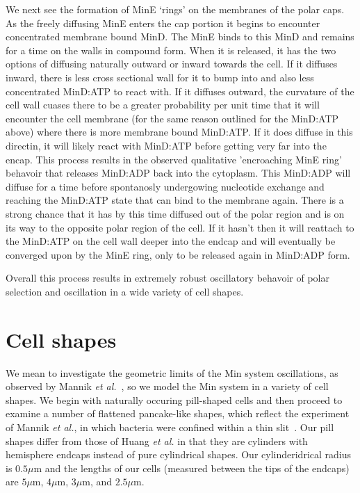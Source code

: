 \documentclass[letterpaper,twocolumn,amsmath,amssymb,pre]{revtex4-1}
\newcommand\micron{\ensuremath{\mu\text{m}}}
\begin{document}
We next see the formation of MinE `rings' on the membranes of the
polar caps.  As the freely diffusing MinE enters the cap portion it
begins to encounter concentrated membrane bound MinD.  The MinE binds
to this MinD and remains for a time on the walls in compound form.
When it is released, it has the two options of diffusing naturally
outward or inward towards the cell.  If it diffuses inward, there is
less cross sectional wall for it to bump into and also less
concentrated MinD:ATP to react with.  If it diffuses outward, the
curvature of the cell wall cuases there to be a greater probability
per unit time that it will encounter the cell membrane (for the same
reason outlined for the MinD:ATP above) where there is more membrane
bound MinD:ATP. If it does diffuse in this directin, it will likely
react with MinD:ATP before getting very far into the encap.  This
process results in the observed qualitative 'encroaching MinE ring'
behavoir that releases MinD:ADP back into the cytoplasm.  This
MinD:ADP will diffuse for a time before spontanosly undergowing
nucleotide exchange and reaching the MinD:ATP state that
can bind to the membrane again.  There is a strong chance that it has
by this time diffused out of the polar region and is on its way to the
opposite polar region of the cell.  If it hasn't then it will reattach
to the MinD:ATP on the cell wall deeper into the endcap and will
eventually be converged upon by the MinE ring, only to be released
again in MinD:ADP form.

Overall this process results in extremely robust oscillatory
behavoir of polar selection and oscillation in a wide variety of cell
shapes.

\section{Cell shapes}

We mean to investigate the geometric limits of the Min system
oscillations, as observed by Mannik \emph{et
  al.}~\cite{mannik2012robustness}, so we model the Min system in a
variety of cell shapes.  We begin with naturally occuring pill-shaped
cells and then proceed to examine a number of flattened pancake-like
shapes, which reflect the experiment of Mannik \emph{et al.}, in which
bacteria were confined within a thin slit~\cite{mannik2012robustness}.
Our pill shapes differ from those of Huang \emph{et al.} in that they
are cylinders with hemisphere endcaps instead of pure cylindrical
shapes.  Our cylinderidrical radius is $0.5\micron$ and the lengths
of our cells (measured between the tips of the endcaps) are
$5\micron$, $4\micron$, $3\micron$, and $2.5\micron$.
\end{document}
